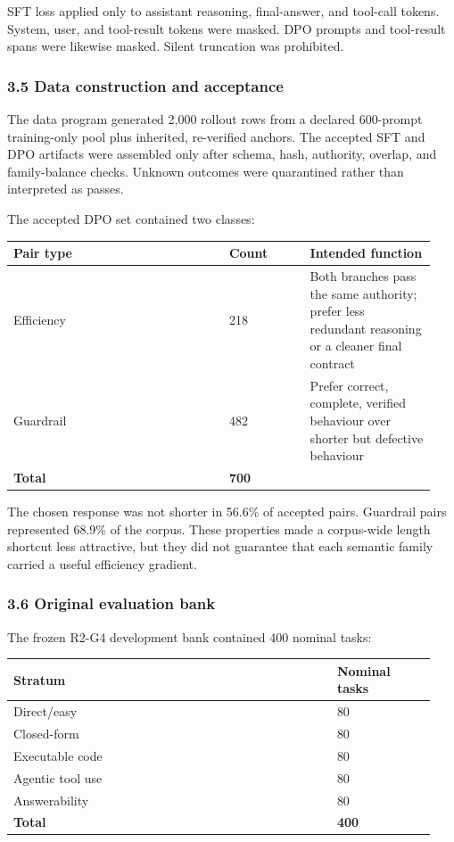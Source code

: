 \documentclass[
  9pt,
  letterpaper,
]{article}
\begin{document}
SFT loss applied only to assistant reasoning, final-answer, and
tool-call tokens. System, user, and tool-result tokens were masked. DPO
prompts and tool-result spans were likewise masked. Silent truncation
was prohibited.

\hypertarget{35-data-construction-and-acceptance}{%
\subsubsection{3.5 Data construction and
acceptance}\label{35-data-construction-and-acceptance}}

The data program generated 2,000 rollout rows from a declared 600-prompt
training-only pool plus inherited, re-verified anchors. The accepted SFT
and DPO artifacts were assembled only after schema, hash, authority,
overlap, and family-balance checks. Unknown outcomes were quarantined
rather than interpreted as passes.

The accepted DPO set contained two classes:

\begin{longtable}[]{@{}p{0.48\linewidth}p{0.18\linewidth}p{0.28\linewidth}@{}}
\toprule\noalign{}
Pair type & Count & Intended function \\
\midrule\noalign{}
\endhead
\bottomrule\noalign{}
\endlastfoot
Efficiency & 218 & Both branches pass the same authority; prefer less
redundant reasoning or a cleaner final contract \\
Guardrail & 482 & Prefer correct, complete, verified behaviour over
shorter but defective behaviour \\
\textbf{Total} & \textbf{700} & \\
\end{longtable}

The chosen response was not shorter in 56.6\% of accepted pairs.
Guardrail pairs represented 68.9\% of the corpus. These properties made
a corpus-wide length shortcut less attractive, but they did not
guarantee that each semantic family carried a useful efficiency
gradient.

\hypertarget{36-original-evaluation-bank}{%
\subsubsection{3.6 Original evaluation
bank}\label{36-original-evaluation-bank}}

The frozen R2-G4 development bank contained 400 nominal tasks:

\begin{longtable}[]{@{}p{0.72\linewidth}p{0.22\linewidth}@{}}
\toprule\noalign{}
Stratum & Nominal tasks \\
\midrule\noalign{}
\endhead
\bottomrule\noalign{}
\endlastfoot
Direct/easy & 80 \\
Closed-form & 80 \\
Executable code & 80 \\
Agentic tool use & 80 \\
Answerability & 80 \\
\textbf{Total} & \textbf{400} \\
\end{longtable}
\end{document}
